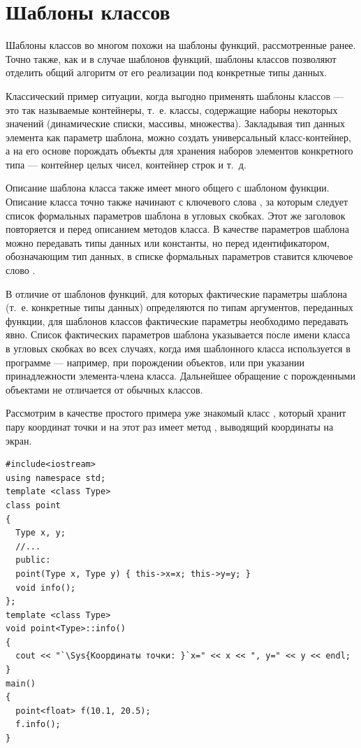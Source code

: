 \section[Шаблоны классов]{Шаблоны классов}
Шаблоны классов во многом похожи на шаблоны функций, рассмотренные ранее. Точно также, как и в
случае шаблонов функций, шаблоны классов позволяют отделить общий алгоритм от его реализации под
конкретные типы данных. 

Классический пример ситуации, когда выгодно применять шаблоны классов --- это так называемые контейнеры, т.~е. классы,
содержащие наборы некоторых значений (динамические списки, массивы, множества). Закладывая тип данных элемента как
параметр шаблона, можно создать универсальный класс-контейнер, а на его основе порождать объекты для хранения наборов
элементов конкретного типа --- контейнер целых чисел, контейнер строк и т.~д.

Описание шаблона класса также имеет много общего с шаблоном функции. Описание класса точно также начинают с ключевого
слова , за которым следует список формальных параметров шаблона в угловых скобках. Этот
же заголовок повторяется и перед описанием методов класса. В качестве параметров шаблона можно передавать типы данных
или константы, но перед идентификатором, обозначающим тип данных, в списке формальных параметров ставится ключевое
слово .

В отличие от шаблонов функций, для которых фактические параметры шаблона (т.~е. конкретные типы данных) определяются по
типам аргументов, переданных функции, для шаблонов классов фактические параметры необходимо передавать явно. Список
фактических параметров шаблона указывается после имени класса в угловых скобках во всех случаях, когда имя шаблонного
класса используется в программе --- например, при порождении объектов, или при указании принадлежности элемента-члена
класса. Дальнейшее обращение с порожденными объектами не отличается от обычных классов.

Рассмотрим в качестве простого примера уже знакомый класс , который хранит пару координат
точки и на этот раз имеет метод , выводящий координаты на экран.
\begin{lstlisting}
#include<iostream>
using namespace std;
template <class Type> 
class point 
{
  Type x, y;
  //...
  public:
  point(Type x, Type y) { this->x=x; this->y=y; }
  void info();
};
template <class Type>
void point<Type>::info() 
{
  cout << "`\Sys{Координаты точки: }`x=" << x << ", y=" << y << endl; 
}
main()
{
  point<float> f(10.1, 20.5);
  f.info();
}
\end{lstlisting}

